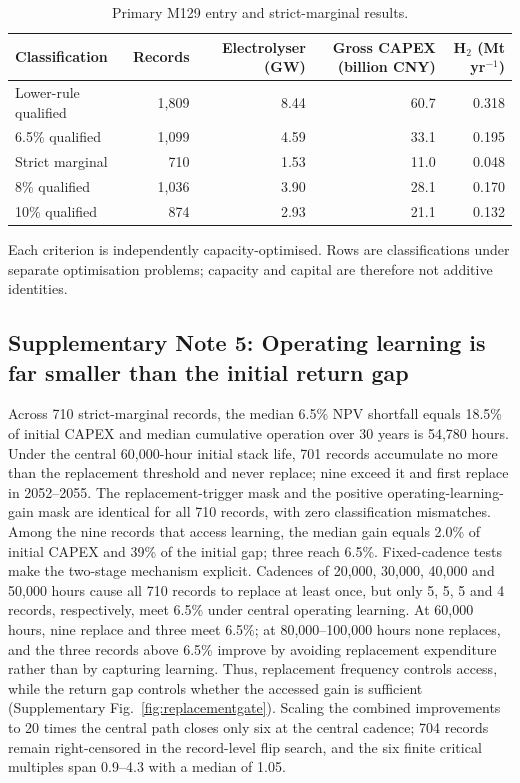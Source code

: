 \documentclass[11pt,a4paper]{article}
\begin{document}
\begin{table}[t]
\caption{Primary M129 entry and strict-marginal results.}\label{tab:headline}
\centering
\footnotesize
\begin{tabular}{lrrrr}
\toprule
Classification & Records & Electrolyser (GW) & Gross CAPEX (billion CNY) & H$_2$ (Mt yr$^{-1}$) \\
\midrule
Lower-rule qualified & 1,809 & 8.44 & 60.7 & 0.318 \\
6.5\% qualified & 1,099 & 4.59 & 33.1 & 0.195 \\
Strict marginal & 710 & 1.53 & 11.0 & 0.048 \\
8\% qualified & 1,036 & 3.90 & 28.1 & 0.170 \\
10\% qualified & 874 & 2.93 & 21.1 & 0.132 \\
\bottomrule
\end{tabular}
\begin{flushleft}\footnotesize
Each criterion is independently capacity-optimised. Rows are classifications under separate optimisation problems; capacity and capital are therefore not additive identities.
\end{flushleft}
\end{table}

\subsection*{Supplementary Note 5: Operating learning is far smaller than the initial return gap}

Across 710 strict-marginal records, the median 6.5\% NPV shortfall equals 18.5\% of initial CAPEX and median cumulative operation over 30 years is 54,780 hours. Under the central 60,000-hour initial stack life, 701 records accumulate no more than the replacement threshold and never replace; nine exceed it and first replace in 2052--2055. The replacement-trigger mask and the positive operating-learning-gain mask are identical for all 710 records, with zero classification mismatches. Among the nine records that access learning, the median gain equals 2.0\% of initial CAPEX and 39\% of the initial gap; three reach 6.5\%. Fixed-cadence tests make the two-stage mechanism explicit. Cadences of 20,000, 30,000, 40,000 and 50,000 hours cause all 710 records to replace at least once, but only 5, 5, 5 and 4 records, respectively, meet 6.5\% under central operating learning. At 60,000 hours, nine replace and three meet 6.5\%; at 80,000--100,000 hours none replaces, and the three records above 6.5\% improve by avoiding replacement expenditure rather than by capturing learning. Thus, replacement frequency controls access, while the return gap controls whether the accessed gain is sufficient (Supplementary Fig.~\ref{fig:replacementgate}). Scaling the combined improvements to 20 times the central path closes only six at the central cadence; 704 records remain right-censored in the record-level flip search, and the six finite critical multiples span 0.9--4.3 with a median of 1.05.
\end{document}
